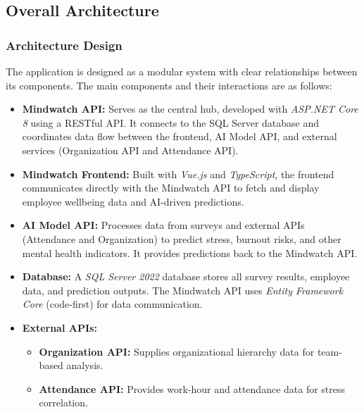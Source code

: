 \documentclass[conference]{IEEEtran}
\begin{document}
        \subsection{Overall Architecture}

            \subsubsection{Architecture Design}
            
                The application is designed as a modular system with clear relationships between its components. The main components and their interactions are as follows:
                
                \begin{itemize}
                    \item \textbf{Mindwatch API:} Serves as the central hub, developed with \textit{ASP.NET Core 8} using a RESTful API. It connects to the SQL Server database and coordinates data flow between the frontend, AI Model API, and external services (Organization API and Attendance API).
                    
                    \item \textbf{Mindwatch Frontend:} Built with \textit{Vue.js} and \textit{TypeScript}, the frontend communicates directly with the Mindwatch API to fetch and display employee wellbeing data and AI-driven predictions.
                
                    \item \textbf{AI Model API:} Processes data from surveys and external APIs (Attendance and Organization) to predict stress, burnout risks, and other mental health indicators. It provides predictions back to the Mindwatch API.
                
                    \item \textbf{Database:} A \textit{SQL Server 2022} database stores all survey results, employee data, and prediction outputs. The Mindwatch API uses \textit{Entity Framework Core} (code-first) for data communication.
                
                    \item \textbf{External APIs:} 
                    \begin{itemize}
                        \item \textbf{Organization API:} Supplies organizational hierarchy data for team-based analysis.
                        \item \textbf{Attendance API:} Provides work-hour and attendance data for stress correlation.
                    \end{itemize}
                \end{itemize}
                
\end{document}
